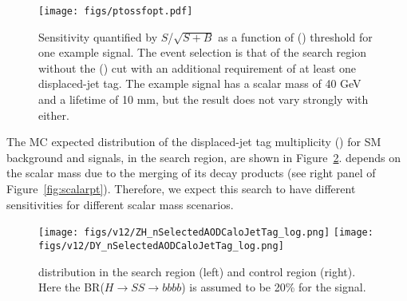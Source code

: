\begin{figure}[h!]
  \caption{Sensitivity quantified by $S$/$\sqrt{S+B}$ as a function of \pt(\dilepton) threshold for one example signal.
    The event selection is that of the \twomuzh search region without the  \pt(\dilepton) cut
    with an additional requirement of at least one displaced-jet tag.
    The example signal has a scalar mass of 40 GeV and a lifetime of 10 mm, but the result does not vary strongly with either.
}
  \label{fig:ptossfopt}
  \centering
  \texttt{[image: figs/ptossfopt.pdf]}
\end{figure}



The MC expected distribution of the displaced-jet tag multiplicity (\NTAGS)
for SM background and signals, in the \twollzh search region, are shown in
Figure~\ref{fig:ntag_cp_2020_2}.
\NTAGS depends on the scalar mass due to the merging of its decay products
(see right panel of Figure~\ref{fig:scalarpt}).
Therefore, we expect this search to have different sensitivities for different scalar mass
scenarios.

\begin{figure}[h!]
  \caption{\NTAGS distribution in the \twollzh search region (left) and \twolldy
  control region (right). Here the BR($H\rightarrow SS \rightarrow bbbb$) is assumed to be 20\% for the signal.}
  \label{fig:ntag_cp_2020_2}
  \centering
  \texttt{[image: figs/v12/ZH\_nSelectedAODCaloJetTag\_log.png]}
  \texttt{[image: figs/v12/DY\_nSelectedAODCaloJetTag\_log.png]}

\end{figure}


